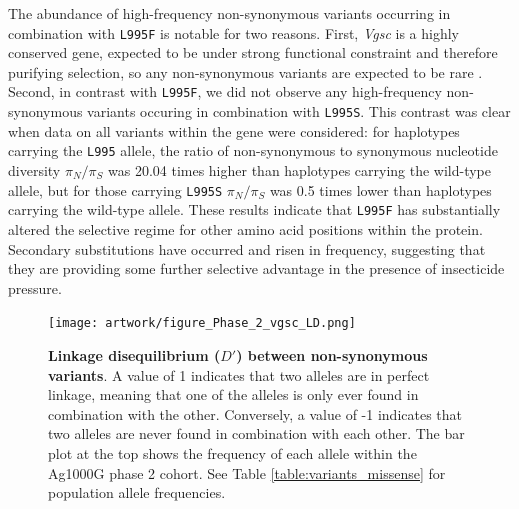 \documentclass[a4paper,11pt,abstracton,hidelinks]{scrartcl}
\begin{document}
The abundance of high-frequency non-synonymous variants occurring in combination with \texttt{L995F} is notable for two reasons.
%
First, \textit{Vgsc} is a highly conserved gene, expected to be under strong functional constraint and therefore purifying selection, so any non-synonymous variants are expected to be rare \cite{Davies2007b}.
%
Second, in contrast with \texttt{L995F}, we did not observe any high-frequency non-synonymous variants occuring in combination with \texttt{L995S}.
%
This contrast was clear when data on all variants within the gene were considered: for haplotypes carrying the \texttt{L995} allele, the ratio of non-synonymous to synonymous nucleotide diversity $\pi_{N}/\pi_{S}$ was 20.04 times higher than haplotypes carrying the wild-type allele, but for those carrying \texttt{L995S} $\pi_{N}/\pi_{S}$ was 0.5 times lower than haplotypes carrying the wild-type allele.
%
These results indicate that \texttt{L995F} has substantially altered the selective regime for other amino acid positions within the protein.
%
Secondary substitutions have occurred and risen in frequency, suggesting that they are providing some further selective advantage in the presence of insecticide pressure.


%
\begin{figure}[!t]

  \centering

  \texttt{[image: artwork/figure\_Phase\_2\_vgsc\_LD.png]}

  \caption{\textbf{Linkage disequilibrium ($D'$) between non-synonymous variants}. A value of 1 indicates that two alleles are in perfect linkage, meaning that one of the alleles is only ever found in combination with the other. Conversely, a value of -1 indicates that two alleles are never found in combination with each other. The bar plot at the top shows the frequency of each allele within the Ag1000G phase 2 cohort. See Table \ref{table:variants_missense} for population allele frequencies.}

  \label{fig:ld}

\end{figure}
\end{document}
